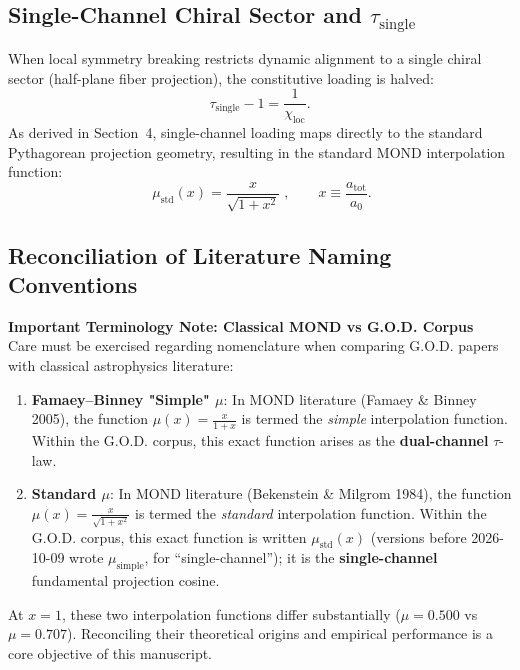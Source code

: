 \documentclass[11pt,a4paper]{article}
\theoremstyle{definition}
\begin{document}
\subsection{Single-Channel Chiral Sector and $\tau_{\text{single}}$}
When local symmetry breaking restricts dynamic alignment to a single chiral sector (half-plane fiber projection), the constitutive loading is halved:
\begin{equation}
\tau_{\text{single}} - 1 = \frac{1}{\chi_{\text{loc}}}.
\end{equation}
As derived in Section~4, single-channel loading maps directly to the standard Pythagorean projection geometry, resulting in the standard MOND interpolation function:
\begin{equation}
\boxed{\;\mu_{\text{std}}(x) = \frac{x}{\sqrt{1+x^2}}\;}, \qquad x \equiv \frac{a_{\text{tot}}}{a_0}.
\label{eq:single_channel_law}
\end{equation}

\subsection{Reconciliation of Literature Naming Conventions}
\begin{mdframed}[style=codexcyan]
{\color{cyan}\bfseries Important Terminology Note: Classical MOND vs G.O.D. Corpus}\\[0.1cm]
Care must be exercised regarding nomenclature when comparing G.O.D. papers with classical astrophysics literature:
\begin{enumerate}
\item \textbf{Famaey--Binney "Simple" $\mu$}: In MOND literature (Famaey \& Binney 2005), the function $\mu(x) = \frac{x}{1+x}$ is termed the \emph{simple} interpolation function. Within the G.O.D. corpus, this exact function arises as the \textbf{dual-channel} $\tau$-law.
\item \textbf{Standard $\mu$}: In MOND literature (Bekenstein \& Milgrom 1984), the function $\mu(x) = \frac{x}{\sqrt{1+x^2}}$ is termed the \emph{standard} interpolation function. Within the G.O.D. corpus, this exact function is written $\mu_{\text{std}}(x)$ (versions before 2026-10-09 wrote $\mu_{\text{simple}}$, for ``single-channel''); it is the \textbf{single-channel} fundamental projection cosine.
\end{enumerate}
At $x=1$, these two interpolation functions differ substantially ($\mu = 0.500$ vs $\mu = 0.707$). Reconciling their theoretical origins and empirical performance is a core objective of this manuscript.
\end{mdframed}
\end{document}
